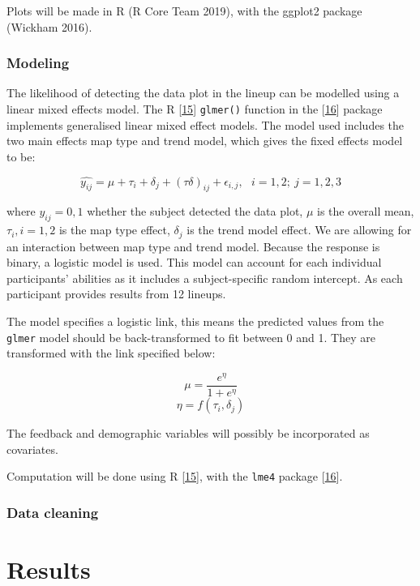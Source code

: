 \documentclass[conference,final,]{IEEEtran}
\begin{document}
Plots will be made in R (R Core Team 2019), with the ggplot2 package (Wickham 2016).

\hypertarget{modeling}{%
\subsubsection{Modeling}\label{modeling}}

The likelihood of detecting the data plot in the lineup can be modelled using a linear mixed effects model.
The R {[}\protect\hyperlink{ref-RCore}{15}{]} \texttt{glmer()} function in the {[}\protect\hyperlink{ref-lme4}{16}{]} package implements generalised linear mixed effect models. The model used includes the two main effects map type and trend model, which gives the fixed effects model to be:

\[\widehat{y_{ij}} = \mu + \tau_i + \delta_j + (\tau\delta)_{ij} + \epsilon_{i,j}, ~~~ i=1,2; ~j=1,2,3\]

where \(y_{ij} = 0, 1\) whether the subject detected the data plot, \(\mu\) is the overall mean, \(\tau_i, i=1,2\) is the map type effect, \(\delta_j\) is the trend model effect. We are allowing for an interaction between map type and trend model. Because the response is binary, a logistic model is used. This model can account for each individual participants' abilities as it includes a subject-specific random intercept. As each participant provides results from 12 lineups.

The model specifies a logistic link, this means the predicted values from the \texttt{glmer} model should be back-transformed to fit between 0 and 1. They are transformed with the link specified below:

\[\mu = \frac{e^{\eta}}{1 + e^{\eta}}\] \label{eq:transform}
\[\eta = f(\tau_i,\delta_j)\]

The feedback and demographic variables will possibly be incorporated as covariates.

Computation will be done using R {[}\protect\hyperlink{ref-RCore}{15}{]}, with the \texttt{lme4} package {[}\protect\hyperlink{ref-lme4}{16}{]}.

\hypertarget{data-cleaning}{%
\subsubsection{Data cleaning}\label{data-cleaning}}

\hypertarget{results}{%
\section{Results}\label{results}}
\end{document}
